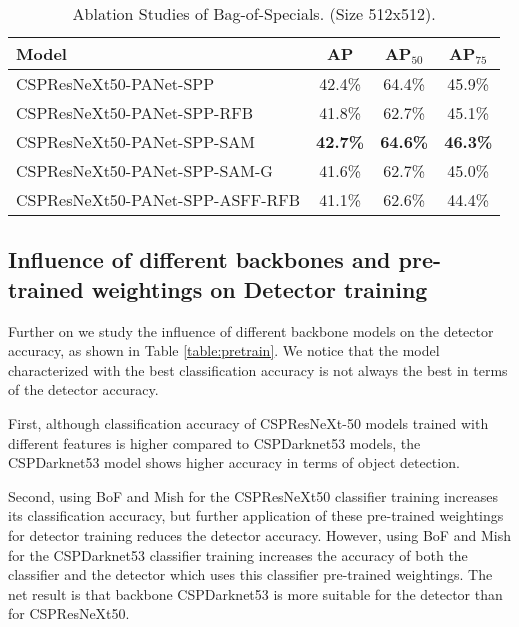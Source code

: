 \documentclass[10pt,twocolumn,letterpaper]{article}
\begin{document}
\begin{table}[h]
	\centering
	\begin{threeparttable}[h]
		\footnotesize
		\caption{Ablation Studies of Bag-of-Specials. (Size 512x512).}
		\label{table:bos}
		\setlength\tabcolsep{3.5pt}
		\begin{tabular}{lccc}
			\toprule
			\textbf{Model} & \textbf{AP} & \textbf{AP$_{50}$} & \textbf{AP$_{75}$} \\			
			\midrule
			CSPResNeXt50-PANet-SPP & 42.4\% & 64.4\% & 45.9\% \\
			CSPResNeXt50-PANet-SPP-RFB & 41.8\% & 62.7\% & 45.1\% \\
			CSPResNeXt50-PANet-SPP-SAM & \textbf{42.7\%} & \textbf{64.6\%} & \textbf{46.3\%} \\
			CSPResNeXt50-PANet-SPP-SAM-G & 41.6\% & 62.7\% & 45.0\% \\
			CSPResNeXt50-PANet-SPP-ASFF-RFB & 41.1\% & 62.6\% & 44.4\% \\
			\bottomrule
		\end{tabular}
	\end{threeparttable}
\end{table}

\subsection{Influence of different backbones and pre-trained weightings on Detector training}

Further on we study the influence of different backbone models on the detector accuracy, as shown in Table \ref{table:pretrain}. We notice that the model characterized with the best classification accuracy is not always the best in terms of the detector accuracy. 

First, although classification accuracy of CSPResNeXt-50 models trained with different features is higher compared to CSPDarknet53 models, the CSPDarknet53 model shows higher accuracy in terms of object detection. 

Second, using BoF and Mish for the CSPResNeXt50 classifier training increases its classification accuracy, but further application of these pre-trained weightings for detector training reduces the detector accuracy. However, using BoF and Mish for the CSPDarknet53 classifier training increases the accuracy of both the classifier and the detector which uses this classifier pre-trained weightings. The net result is that backbone CSPDarknet53 is more suitable for the detector than for CSPResNeXt50.
\end{document}
